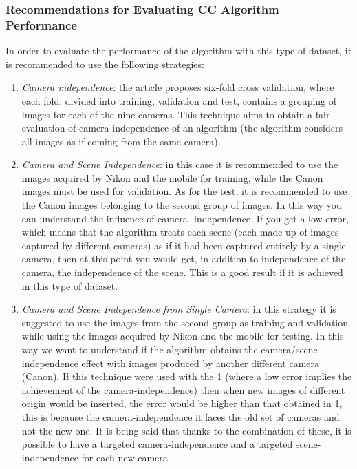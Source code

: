 \subsubsection{Recommendations for Evaluating CC Algorithm Performance}
In order to evaluate the performance of the algorithm with this type of 
dataset, it is recommended to use the following strategies:
\begin{enumerate}
    \item \emph{Camera independence}: the article proposes six-fold cross validation, 
    where each fold, divided into training, validation and test, contains a 
    grouping of images for each of the nine cameras. This technique aims 
    to obtain a fair evaluation of camera-independence of an algorithm (the 
    algorithm considers all images as if coming from the same camera).
    \item \emph{Camera and Scene Independence}: in this case it is recommended to 
    use the images acquired by Nikon and the mobile for training, while 
    the Canon images must be used for validation. As for the test, it is 
    recommended to use the Canon images belonging to the second group 
    of images. In this way you can understand the influence of camera-
    independence. If you get a low error, which means that the algorithm 
    treats each scene (each made up of images captured by different cameras) 
    as if it had been captured entirely by a single camera, then at 
    this point you would get, in addition to independence of the camera, 
    the independence of the scene. This is a good result if it is achieved in 
    this type of dataset.
    \item \emph{Camera and Scene Independence from Single Camera}: in this strategy 
    it is suggested to use the images from the second group as training 
    and validation while using the images acquired by Nikon and the 
    mobile for testing. In this way we want to understand if the algorithm 
    obtains the camera/scene independence effect with images produced 
    by another different camera (Canon). If this technique were 
    used with the 1 (where a low error implies the achievement of the 
    camera-independence) then when new images of different origin would 
    be inserted, the error would be higher than that obtained in 1, this is 
    because the camera-independence it faces the old set of cameras and not 
    the new one. It is being said that thanks to the combination of these, 
    it is possible to have a targeted camera-independence and a targeted 
    scene-independence for each new camera.

\end{enumerate}
